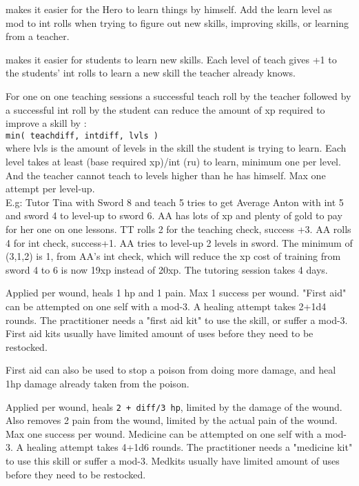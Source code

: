  makes it easier for the Hero to learn things by himself. Add the learn level as mod to int rolls when trying to figure out new skills, improving skills, or learning from a teacher.


 makes it easier for students to learn new skills. Each level of teach gives +1 to the students' int rolls to learn a new skill the teacher already knows.

For one on one teaching sessions a successful teach roll by the teacher followed by a successful int roll by the student can reduce the amount of xp required to improve a skill by :\\
\verb|min( teachdiff, intdiff, lvls )|\\
where lvls is the amount of levels in the skill the student is trying to learn.
Each level takes at least (base required xp)/int (ru) to learn, minimum one per level. And the teacher cannot teach to levels higher than he has himself. Max one attempt per level-up.\\
E.g: Tutor Tina with Sword 8 and teach 5 tries to get Average Anton with int 5 and sword 4 to level-up to sword 6. AA has lots of xp and plenty of gold to pay for her one on one lessons. TT rolls 2 for the teaching check, success +3. AA rolls 4 for int check, success+1. AA tries to level-up 2 levels in sword. The minimum of (3,1,2) is 1, from AA's int check, which will reduce the xp cost of training from sword 4 to 6 is now 19xp instead of 20xp. The tutoring session takes 4 days.


 Applied per wound, heals 1 hp and 1 pain. Max 1 success per wound. "First aid" can be attempted on one self with a mod-3. A healing attempt takes 2+1d4 rounds. The practitioner needs a "first aid kit" to use the skill, or suffer a mod-3. First aid kits usually have limited amount of uses before they need to be restocked.

First aid can also be used to stop a poison from doing more damage, and heal 1hp damage already taken from the poison.


 Applied per wound, heals \verb|2 + diff/3 hp|, limited by the damage of the wound. Also removes 2 pain from the wound, limited by the actual pain of the wound. Max one success per wound. Medicine can be attempted on one self with a mod-3. A healing attempt takes 4+1d6 rounds. The practitioner needs a "medicine kit" to use this skill or suffer a mod-3. Medkits usually have limited amount of uses before they need to be restocked.

